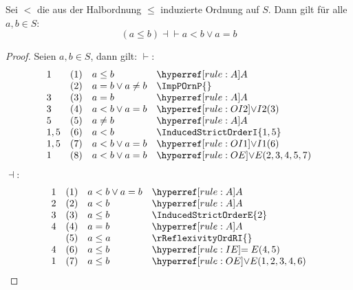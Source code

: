 \documentclass[main.tex]{subfiles}
\begin{document}
\label{LpaLeqbRpEqvaLneqbOraEqualsb}
\begin{theorem}[\((a\leq b)\dashv\vdash a<b\lor a=b\)]
    Sei \(<\) die aus der Halbordnung \(\leq\) induzierte Ordnung auf \(S\). Dann gilt für alle \(a,b\in S\):
    \[
    (a\leq b)\dashv\vdash a<b\lor a=b
    \]
\end{theorem}
\begin{proof}
        Seien \(a,b\in S\), dann gilt:
\(\vdash\):
	\[
        \begin{array}{llll}
            1   &   (1) &   a\leq b             &   \rA                         \\
                &   (2) &   a=b\lor a\neq b     &   \ImpPOrnP{}                 \\
            3   &   (3) &   a=b                 &   \rA                         \\
            3   &   (4) &   a<b\lor a=b         &   \rOIb{3}                    \\
            5   &   (5) &   a\neq b             &   \rA                         \\
            1,5 &   (6) &   a<b                 &   \InducedStrictOrderI{1,5}   \\   
            1,5 &   (7) &   a<b\lor a=b         &   \rOIa{6}                    \\
            1   &   (8) &   a<b\lor a=b         &   \rOE{2,3,4,5,7}             \\
        \end{array}
	\]
 \(\dashv\):
 	\[
        \begin{array}{llll}
            1   &   (1) &   a<b\lor a=b         &   \rA                         \\
            2   &   (2) &   a<b                 &   \rA                         \\
            3   &   (3) &   a\leq b             &   \InducedStrictOrderE{2}     \\
            4   &   (4) &   a=b                 &   \rA                         \\
                &   (5) &   a\leq a             &   \rReflexivityOrdRI{}        \\
            4   &   (6) &   a\leq b             &   \rIE{4,5}                   \\
            1   &   (7) &   a\leq b             &   \rOE{1,2,3,4,6}             \\
        \end{array}
	\]
\end{proof}
\end{document}
